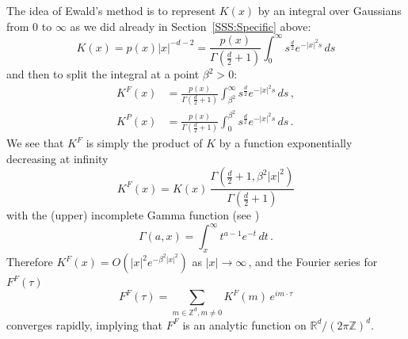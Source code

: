 \documentclass[12pt]{amsart}
\theoremstyle{definition}
\theoremstyle{remark}
\numberwithin{equation}{section}
\newcommand\R{{\mathbb R}}
\newcommand\Z{{\mathbb Z}}
\begin{document}
The idea of Ewald's method is to represent $K(x)$ by an integral over Gaussians from $0$ to $\infty$ as we did already in Section~\ref{SSS:Specific} above:
\begin{equation}
\label{E:intK}
 K(x) = p(x)|x|^{-d-2} = 
 \frac{p(x)}{\Gamma(\frac d2+1)}\int_{0}^{\infty} s^{\frac d2}e^{-|x|^{2}s}\,ds
\end{equation}
and then to split the integral at a point $\beta^{2}>0$:
\begin{align}
\label{E:intKF}
K^{F}(x) &= \frac{p(x)}{\Gamma(\frac d2+1)}\int_{\beta^{2}}^{\infty} s^{\frac d2}e^{-|x|^{2}s}\,ds\,,\\
\label{E:intKP}
K^{P}(x) &= \frac{p(x)}{\Gamma(\frac d2+1)}\int_{0}^{\beta^{2}} s^{\frac d2}e^{-|x|^{2}s}\,ds\,.
\end{align}
We see that $K^{F}$ is simply the product of $K$ by a function exponentially decreasing at infinity
\begin{equation}
\label{E:KF=KxGamma}
  K^{F}(x) = K(x) \, \frac{\Gamma(\tfrac d2+1,\beta^{2}|x|^{2})}{\Gamma(\frac d2+1)}
\end{equation}
with the (upper) incomplete Gamma function (see \cite[\S 6.5]{Abramowitz-Stegun_1964})
$$
  \Gamma(a,x)=\int_{x}^{\infty}t^{a-1}e^{-t}\,dt\,.
$$
Therefore 
 $K^{F}(x) = O(|x|^{2}e^{-\beta^{2} |x|^{2}})$ as $|x|\to\infty$\,, and the Fourier series for $F^{F}(\tau)$
\begin{equation}
\label{E:serFF}
 F^{F}(\tau) =  \sum_{m\in\Z^{d},m\ne0}K^{F}(m)\,e^{im\cdot \tau}
\end{equation}
converges rapidly, implying that $F^{F}$ is an analytic function on $\R^{d}/(2\pi\Z)^{d}$.
\end{document}
